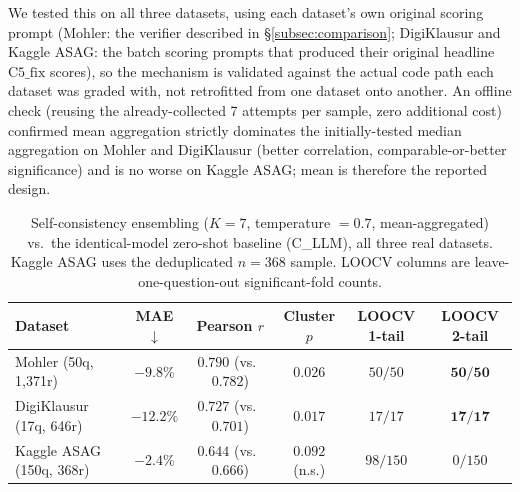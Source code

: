\documentclass[conference]{IEEEtran}
\begin{document}
We tested this on all three datasets, using each dataset's own original
scoring prompt (Mohler: the verifier described in
\S\ref{subsec:comparison}; DigiKlausur and Kaggle ASAG: the batch
scoring prompts that produced their original headline $\text{C5\_fix}$
scores), so the mechanism is validated against the actual code path each
dataset was graded with, not retrofitted from one dataset onto another.
An offline check (reusing the already-collected 7 attempts per sample,
zero additional cost) confirmed mean aggregation strictly dominates the
initially-tested median aggregation on Mohler and DigiKlausur (better
correlation, comparable-or-better significance) and is no worse on
Kaggle ASAG; mean is therefore the reported design.

\begin{table}[t]
\caption{Self-consistency ensembling ($K{=}7$, temperature $=0.7$, mean-aggregated)
         vs.\ the identical-model zero-shot baseline (C\_LLM), all three
         real datasets. Kaggle ASAG uses the deduplicated $n=368$ sample.
         LOOCV columns are leave-one-question-out significant-fold counts.}
\label{tab:selfconsistency}
\centering
\footnotesize
\setlength{\tabcolsep}{4pt}
\begin{tabular}{lccccc}
\toprule
\textbf{Dataset} & \textbf{MAE $\downarrow$} & \textbf{Pearson $r$} &
\textbf{Cluster $p$} & \textbf{LOOCV 1-tail} & \textbf{LOOCV 2-tail} \\
\midrule
Mohler (50q, 1{,}371r)       & $-9.8\%$  & $0.790$ (vs.\ $0.782$) & $0.026$          & $50/50$  & $\mathbf{50/50}$ \\
DigiKlausur (17q, 646r)      & $-12.2\%$ & $0.727$ (vs.\ $0.701$) & $0.017$          & $17/17$  & $\mathbf{17/17}$ \\
Kaggle ASAG (150q, 368r)     & $-2.4\%$  & $0.644$ (vs.\ $0.666$) & $0.092$ (n.s.)   & $98/150$ & $0/150$ \\
\bottomrule
\end{tabular}
\end{table}
\end{document}
